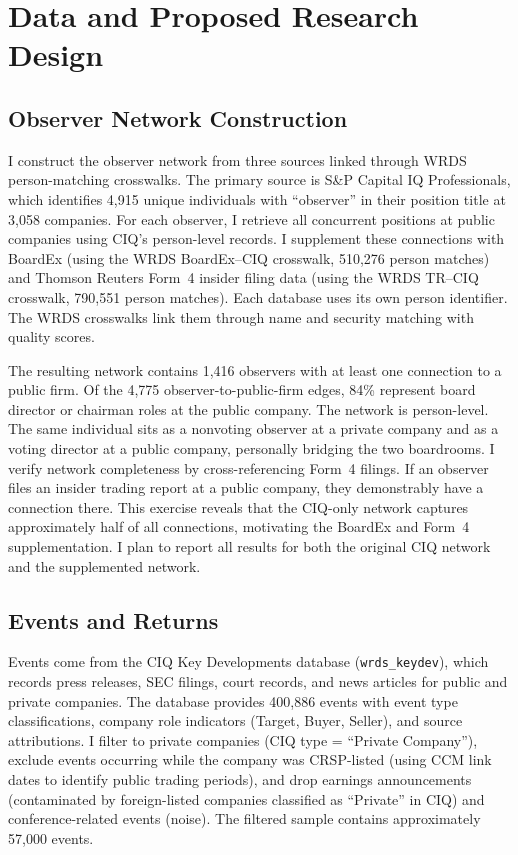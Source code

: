 \section{Data and Proposed Research Design}
\label{sec:data}

\subsection{Observer Network Construction}

I construct the observer network from three sources linked through WRDS person-matching crosswalks. The primary source is S\&P Capital IQ Professionals, which identifies 4,915 unique individuals with ``observer'' in their position title at 3,058 companies. For each observer, I retrieve all concurrent positions at public companies using CIQ's person-level records. I supplement these connections with BoardEx (using the WRDS BoardEx--CIQ crosswalk, 510,276 person matches) and Thomson Reuters Form~4 insider filing data (using the WRDS TR--CIQ crosswalk, 790,551 person matches). Each database uses its own person identifier. The WRDS crosswalks link them through name and security matching with quality scores.

The resulting network contains 1,416 observers with at least one connection to a public firm. Of the 4,775 observer-to-public-firm edges, 84\% represent board director or chairman roles at the public company. The network is person-level. The same individual sits as a nonvoting observer at a private company and as a voting director at a public company, personally bridging the two boardrooms. I verify network completeness by cross-referencing Form~4 filings. If an observer files an insider trading report at a public company, they demonstrably have a connection there. This exercise reveals that the CIQ-only network captures approximately half of all connections, motivating the BoardEx and Form~4 supplementation. I plan to report all results for both the original CIQ network and the supplemented network.

\subsection{Events and Returns}

Events come from the CIQ Key Developments database (\texttt{wrds\_keydev}), which records press releases, SEC filings, court records, and news articles for public and private companies. The database provides 400,886 events with event type classifications, company role indicators (Target, Buyer, Seller), and source attributions. I filter to private companies (CIQ type = ``Private Company''), exclude events occurring while the company was CRSP-listed (using CCM link dates to identify public trading periods), and drop earnings announcements (contaminated by foreign-listed companies classified as ``Private'' in CIQ) and conference-related events (noise). The filtered sample contains approximately 57,000 events.


